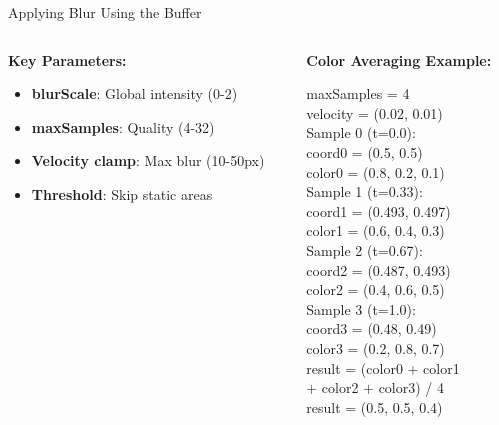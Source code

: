 \documentclass[aspectratio=169]{beamer}
\begin{document}
\begin{frame}[fragile,shrink=12]{Applying Blur Using the Buffer}
\begin{columns}[t]
\begin{column}{0.32\textwidth}
            \vspace{0.1cm}
            {\scriptsize
            \textbf{Key Parameters:}
            \begin{itemize}
                \item \textbf{blurScale}: Global intensity (0-2)
                \item \textbf{maxSamples}: Quality (4-32)
                \item \textbf{Velocity clamp}: Max blur (10-50px)
                \item \textbf{Threshold}: Skip static areas
            \end{itemize}
            }
        \end{column}
        
        \begin{column}{0.31\textwidth}
            \vspace{1.2em}
            \begin{tcolorbox}[colback=purple!8, colframe=purple!30, boxrule=0.5pt, arc=2pt, left=1pt, right=1pt, top=1pt, bottom=1pt]
            \textbf{\tiny Color Averaging Example:}
            
            {\tiny
            maxSamples = 4 \\
            velocity = (0.02, 0.01) \\[0.02cm]
            
            Sample 0 (t=0.0): \\
            coord0 = (0.5, 0.5) \\
            color0 = (0.8, 0.2, 0.1) \\[0.02cm]
            
            Sample 1 (t=0.33): \\
            coord1 = (0.493, 0.497) \\
            color1 = (0.6, 0.4, 0.3) \\[0.02cm]
            
            Sample 2 (t=0.67): \\
            coord2 = (0.487, 0.493) \\
            color2 = (0.4, 0.6, 0.5) \\[0.02cm]
            
            Sample 3 (t=1.0): \\
            coord3 = (0.48, 0.49) \\
            color3 = (0.2, 0.8, 0.7) \\[0.02cm]
            
            result = (color0 + color1 \\
            \phantom{result =} + color2 + color3) / 4 \\
            result = (0.5, 0.5, 0.4)
            }
            \end{tcolorbox}
        \end{column}
    \end{columns}
\end{frame}
\end{document}
